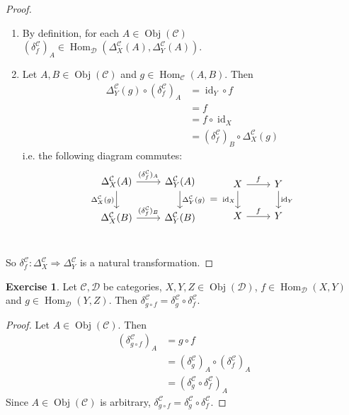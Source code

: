 \documentclass[12pt]{amsart}
\theoremstyle{definition}
\newtheorem{ex}[definition]{Exercise}
\newcommand{\del}{\delta}
\newcommand{\Del}{\Delta}
\newcommand{\MC}{\mathcal{C}}
\newcommand{\MD}{\mathcal{D}}
\DeclareMathOperator{\id}{id}
\DeclareMathOperator{\Obj}{Obj}
\DeclareMathOperator{\Hom}{Hom}
\DeclareMathOperator*{\0}{\mbf{0}}
\DeclareMathOperator*{\1}{\mbf{1}}
\newcommand{\lex}[1]{\label{ex:#1}}
\begin{document}
	\begin{proof} \
		\begin{enumerate}
			\item By definition, for each $A \in \Obj(\MC)$ $(\del^{\MC}_f)_A \in \Hom_{\MD}(\Del^{\MC}_X(A), \Del^{\MC}_Y(A))$.
			\item Let $A, B \in \Obj(\MC)$ and $g \in \Hom_{\MC}(A, B)$. Then 
			\begin{align*}
				\Del^{\MC}_Y(g) \circ (\del^{\MC}_f)_A 
				& = \id_Y \circ f \\
				& = f \\
				& = f \circ \id_X \\
				& = (\del^{\MC}_f)_B \circ \Del^{\MC}_X(g)  
			\end{align*}
			i.e. the following diagram commutes:
			\[ 
			\begin{tikzcd}[baseline= 7]
				\Del^{\MC}_X(A)  \arrow[r, "(\del^{\MC}_f)_A"]  \arrow[d, "\Del^{\MC}_X(g)"']  & \Del^{\MC}_Y(A)   \arrow[d, "\Del^{\MC}_Y(g)"]\\
				\Del^{\MC}_X(B) \arrow[r, "(\del^{\MC}_f)_B"] &  \Del^{\MC}_Y(B) \\
			\end{tikzcd}
			=
			\begin{tikzcd}[baseline= 7]
				X  \arrow[r, "f"]  \arrow[d, "\id_X"']  & Y   \arrow[d, "\id_Y"]\\
				X \arrow[r, "f"] &  Y \\
			\end{tikzcd}
			\]
		\end{enumerate}
		So $\del^{\MC}_f: \Del^{\MC}_X \Rightarrow \Del^{\MC}_Y$ is a natural transformation.
	\end{proof}
	 
	\begin{ex} \lex{14010}
		Let $\MC, \MD$ be categories, $X, Y, Z \in \Obj(\MD)$, $f \in \Hom_{\MD}(X,Y)$ and $g \in \Hom_{\MD}(Y,Z)$. Then $\del^{\MC}_{g \circ f} = \del^{\MC}_g \circ \del^{\MC}_f$.
	\end{ex}

	\begin{proof}
		Let $A \in \Obj(\MC)$. Then 
		\begin{align*}
			(\del^{\MC}_{g \circ f})_A
			& = g \circ f \\
			& = (\del^{\MC}_g)_A \circ (\del^{\MC}_f)_A \\
			& = (\del^{\MC}_g \circ \del^{\MC}_f)_A
		\end{align*}
		Since $A \in \Obj(\MC)$ is arbitrary, $\del^{\MC}_{g \circ f} = \del^{\MC}_g \circ \del^{\MC}_f$.
	\end{proof}
\end{document}
